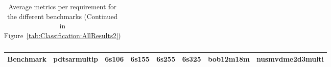 \begin{landscape}
\begin{table}[!t]
\begin{tabular}{|c|c|c|c|c|c|c|c|}
	\end{tabular}
		\caption{Average metrics per requirement for the different benchmarks (Continued in Figure~\ref{tab:Classification:AllResults2})}
		\label{tab:Classification:AllResults1}
		\end{table}	
\end{landscape} 
\newpage
\begin{landscape}
	\begin{table}[!t]
		\centering		
		\centering
		\begin{tabular}{|c|c|c|c|c|c|c|c|}
			\hline
			Benchmark  & pdtsarmultip & 6s106       & 6s155       & 6s255       & 6s325       & bob12m18m   & nusmvdme2d3multi \\ \hline

\end{tabular}
\end{table}
\end{landscape}
